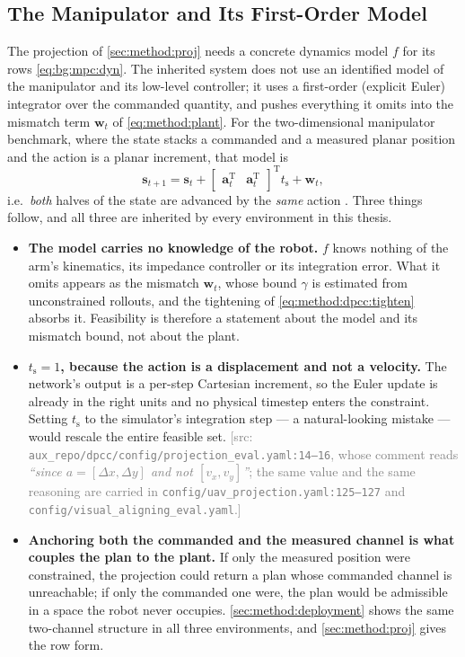 \documentclass[headsepline,footsepline,footinclude=false,oneside,fontsize=11pt,paper=a4,listof=totoc,bibliography=totoc]{scrbook}
\theoremstyle{definition}
\theoremstyle{plain}
\theoremstyle{remark}
\newcommand{\vect}[1]{\boldsymbol{#1}}
\newcommand{\trans}{^{\textrm{T}}}
\newcommand{\sidx}[1]{_{\textrm{#1}}}
\newif\ifsubmission
\newcommand{\srcnote}[1]{\ifsubmission\else\textcolor{gray}{\footnotesize\textsf{[src: #1]}}\fi}
\begin{document}
\subsection{The Manipulator and Its First-Order Model}\label{sec:method:manipulator}

The projection of \autoref{sec:method:proj} needs a concrete dynamics model $f$ for its rows
\eqref{eq:bg:mpc:dyn}. The inherited system does not use an identified
model of the manipulator and its low-level controller; it uses a first-order (explicit Euler)
integrator over the commanded quantity, and pushes everything it omits into the mismatch term
$\vect{w}_{t}$ of \eqref{eq:method:plant}. For the two-dimensional manipulator benchmark, where the
state stacks a commanded and a measured planar position and the action is a planar increment, that
model is
\begin{equation}\label{eq:method:dpcc:euler}
  \vect{s}_{t+1}
  = \vect{s}_{t} + \begin{bmatrix}\vect{a}_{t}\trans & \vect{a}_{t}\trans\end{bmatrix}\trans t\sidx{s}
    + \vect{w}_{t},
\end{equation}
i.e.\ \emph{both} halves of the state are advanced by the \emph{same} action
\parencite[Sec.~6.1]{romer2025diffusion}. Three things follow, and all three are inherited by every
environment in this thesis.

\begin{itemize}
  \item \textbf{The model carries no knowledge of the robot.} $f$ knows nothing of the arm's
    kinematics, its impedance controller or its integration error. What it omits appears as the
    mismatch $\vect{w}_{t}$, whose bound $\gamma$ is estimated from unconstrained rollouts, and the
    tightening of \eqref{eq:method:dpcc:tighten} absorbs it. Feasibility is therefore a statement
    about the model and its mismatch bound, not about the plant.
  \item \textbf{$t\sidx{s} = 1$, because the action is a displacement and not a velocity.} The
    network's output is a per-step Cartesian increment, so the Euler update is already in the right
    units and no physical timestep enters the constraint. Setting $t\sidx{s}$ to the simulator's
    integration step --- a natural-looking mistake --- would rescale the entire feasible set.
    \srcnote{\texttt{aux\_repo/dpcc/config/projection\_eval.yaml:14--16}, whose comment reads
    \emph{``since $a = [\Delta x,\Delta y]$ and not $[v_{x},v_{y}]$''}; the same value and the same
    reasoning are carried in \texttt{config/uav\_projection.yaml:125--127} and
    \texttt{config/visual\_aligning\_eval.yaml}.}
  \item \textbf{Anchoring both the commanded and the measured channel is what couples the plan to
    the plant.} If only the measured position were constrained, the projection could return a plan
    whose commanded channel is unreachable; if only the commanded one were, the plan would be
    admissible in a space the robot never occupies. \autoref{sec:method:deployment} shows the same
    two-channel structure in all three environments, and \autoref{sec:method:proj} gives the row form.
\end{itemize}
\end{document}
